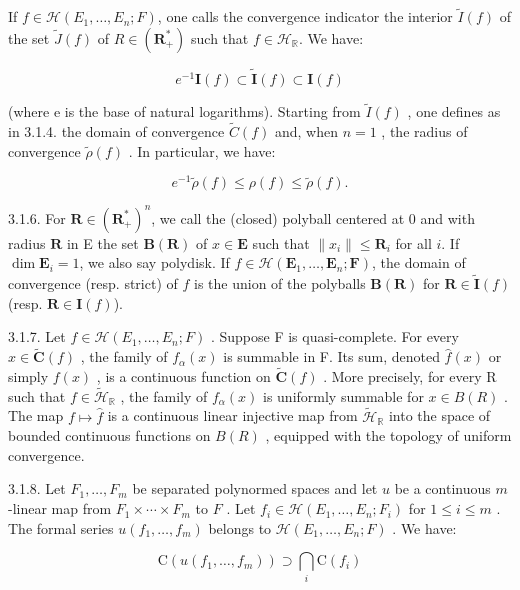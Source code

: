 If \(f \in \mathcal{H}(E_1, \ldots, E_n; F)\), one calls the convergence indicator the interior \(\tilde{I}(f)\) of the set \(\tilde{J}(f)\) of \(R \in (\mathbf{R}_+^*)\) such that \(f \in \mathcal{H}_{\mathbb{R}}\). We have:

\[
e ^ {- 1} \mathbf {I} (f) \subset \tilde{\mathbf {I}} (f) \subset \mathbf {I} (f)
\]

(where e is the base of natural logarithms). Starting from \(\tilde{I}(f)\) , one defines as in 3.1.4. the domain of convergence \(\tilde{C}(f)\) and, when \(n = 1\) , the radius of convergence \(\tilde{\rho}(f)\) . In particular, we have:

\[
e ^ {- 1} \tilde {\rho} (f) \leqslant \rho (f) \leqslant \tilde {\rho} (f).
\]

3.1.6. For \(\mathbf{R} \in (\mathbf{R}_{+}^{*})^{n}\), we call the (closed) polyball centered at 0 and with radius \(\mathbf{R}\) in E the set \(\mathbf{B}(\mathbf{R})\) of \(x \in \mathbf{E}\) such that \(\|x_{i}\| \leqslant \mathbf{R}_{i}\) for all \(i\). If \(\dim \mathbf{E}_{i} = 1\), we also say polydisk. If \(f \in \mathcal{H}(\mathbf{E}_{1}, \ldots, \mathbf{E}_{n}; \mathbf{F})\), the domain of convergence (resp. strict) of \(f\) is the union of the polyballs \(\mathbf{B}(\mathbf{R})\) for \(\mathbf{R} \in \tilde{\mathbf{I}}(f)\) (resp. \(\mathbf{R} \in \mathbf{I}(f)\)).

3.1.7. Let \(f \in \mathcal{H}(E_1, \ldots, E_n; F)\) . Suppose F is quasi-complete. For every \(x \in \tilde{\mathbf{C}}(f)\) , the family of \(f_{\alpha}(x)\) is summable in F. Its sum, denoted \(\hat{f}(x)\) or simply \(f(x)\) , is a continuous function on \(\tilde{\mathbf{C}}(f)\) . More precisely, for every R such that \(f \in \tilde{\mathcal{H}}_{\mathbb{R}}\) , the family of \(f_{\alpha}(x)\) is uniformly summable for \(x \in B(R)\) . The map \(f \mapsto \hat{f}\) is a continuous linear injective map from \(\tilde{\mathcal{H}}_{\mathbb{R}}\) into the space of bounded continuous functions on \(B(R)\) , equipped with the topology of uniform convergence.

3.1.8. Let \(F_1, \ldots, F_m\) be separated polynormed spaces and let \(u\) be a continuous \(m\) -linear map from \(F_1 \times \cdots \times F_m\) to \(F\) . Let \(f_i \in \mathcal{H}(E_1, \ldots, E_n; F_i)\) for \(1 \leqslant i \leqslant m\) . The formal series \(u(f_1, \ldots, f_m)\) belongs to \(\mathcal{H}(E_1, \ldots, E_n; F)\) . We have:

\[
\mathrm{C} (u (f _ {1}, \dots , f _ {m})) \supset \bigcap_ {i} \mathrm{C} (f _ {i})
\]

